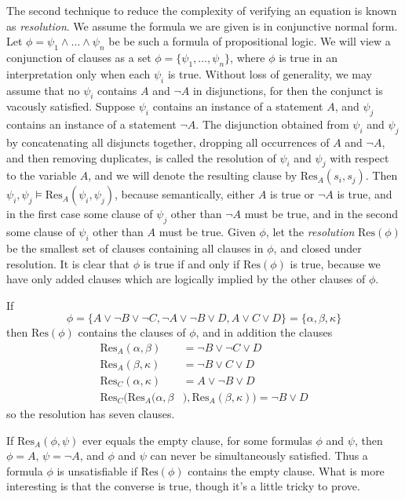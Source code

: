 The second technique to reduce the complexity of verifying an equation is known as \emph{resolution}. We assume the formula we are given is in conjunctive normal form. Let $\phi = \psi_1 \wedge \dots \wedge \psi_n$ be be such a formula of propositional logic. We will view a conjunction of clauses as a set $\phi = \{ \psi_1, \dots, \psi_n \}$, where $\phi$ is true in an interpretation only when each $\psi_i$ is true. Without loss of generality, we may assume that no $\psi_i$ contains $A$ and $\neg A$ in disjunctions, for then the conjunct is vacously satisfied. Suppose $\psi_i$ contains an instance of a statement $A$, and $\psi_j$ contains an instance of a statement $\neg A$. The disjunction obtained from $\psi_i$ and $\psi_j$ by concatenating all disjuncts together, dropping all occurrences of $A$ and $\neg A$, and then removing duplicates, is called the resolution of $\psi_i$ and $\psi_j$ with respect to the variable $A$, and we will denote the resulting clause by $\text{Res}_A(s_i,s_j)$. Then $\psi_i, \psi_j \vDash \text{Res}_A(\psi_i,\psi_j)$, because semantically, either $A$ is true or $\neg A$ is true, and in the first case some clause of $\psi_j$ other than $\neg A$ must be true, and in the second some clause of $\psi_i$ other than $A$ must be true. Given $\phi$, let the \emph{resolution} $\text{Res}(\phi)$ be the smallest set of clauses containing all clauses in $\phi$, and closed under resolution. It is clear that $\phi$ is true if and only if $\text{Res}(\phi)$ is true, because we have only added clauses which are logically implied by the other clauses of $\phi$.

\begin{example}
    If
    \[ \phi = \{ A \vee \neg B \vee \neg C, \neg A \vee \neg B \vee D, A \vee C \vee D \} = \{ \alpha, \beta, \kappa \} \]
    then $\text{Res}(\phi)$ contains the clauses of $\phi$, and in addition the clauses
    \begin{align*}
        \text{Res}_A(\alpha, \beta) &= \neg B \vee \neg C \vee D\\
        \text{Res}_A(\beta, \kappa) &= \neg B \vee C \vee D\\
        \text{Res}_C(\alpha, \kappa) &= A \vee \neg B \vee D\\
        \text{Res}_C(\text{Res}_A(\alpha, \beta&), \text{Res}_A(\beta, \kappa)) = \neg B \vee D
    \end{align*}
    so the resolution has seven clauses.
\end{example}

If $\text{Res}_A(\phi,\psi)$ ever equals the empty clause, for some formulas $\phi$ and $\psi$, then $\phi = A$, $\psi = \neg A$, and $\phi$ and $\psi$ can never be simultaneously satisfied. Thus a formula $\phi$ is unsatisfiable if $\text{Res}(\phi)$ contains the empty clause. What is more interesting is that the converse is true, though it's a little tricky to prove.

